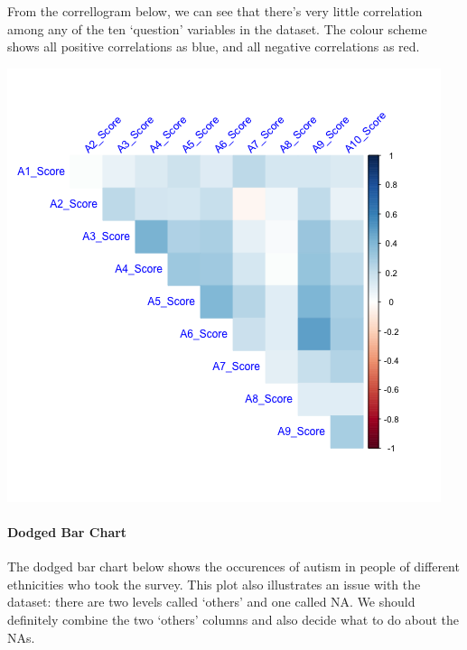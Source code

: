\documentclass[
]{article}
\begin{document}
From the correllogram below, we can see that there's very little
correlation among any of the ten `question' variables in the dataset.
The colour scheme shows all positive correlations as blue, and all
negative correlations as red.

\includegraphics{../images/correlation.png}

\hypertarget{dodged-bar-chart}{%
\paragraph{Dodged Bar Chart}\label{dodged-bar-chart}}

The dodged bar chart below shows the occurences of autism in people of
different ethnicities who took the survey. This plot also illustrates an
issue with the dataset: there are two levels called `others' and one
called NA. We should definitely combine the two `others' columns and
also decide what to do about the NAs.
\end{document}
